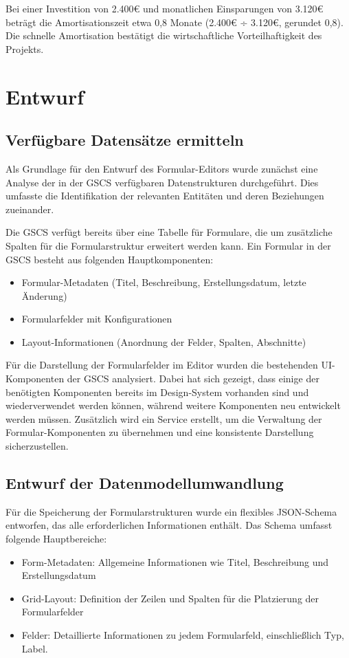 \documentclass[a4paper,11pt]{article}
\begin{document}
\noindent Bei einer Investition von 2.400€ und monatlichen Einsparungen von 3.120€ beträgt die Amortisationszeit etwa 0,8 Monate (2.400€ ÷ 3.120€, gerundet 0,8). Die schnelle Amortisation bestätigt die wirtschaftliche Vorteilhaftigkeit des Projekts.

\section{Entwurf}
\subsection{Verfügbare Datensätze ermitteln}
Als Grundlage für den Entwurf des Formular-Editors wurde zunächst eine Analyse der in der GSCS verfügbaren Datenstrukturen durchgeführt. Dies umfasste die Identifikation der relevanten Entitäten und deren Beziehungen zueinander.

\noindent Die GSCS verfügt bereits über eine Tabelle für Formulare, die um zusätzliche Spalten für die Formularstruktur erweitert werden kann. Ein Formular in der GSCS besteht aus folgenden Hauptkomponenten:

\begin{itemize}
  \item Formular-Metadaten (Titel, Beschreibung, Erstellungsdatum, letzte Änderung)
  \item Formularfelder mit Konfigurationen
  \item Layout-Informationen (Anordnung der Felder, Spalten, Abschnitte)
\end{itemize}

\noindent Für die Darstellung der Formularfelder im Editor wurden die bestehenden UI-Komponenten der GSCS analysiert. Dabei hat sich gezeigt, dass einige der benötigten Komponenten bereits im Design-System vorhanden sind und wiederverwendet werden können, während weitere Komponenten neu entwickelt werden müssen. Zusätzlich wird ein Service erstellt, um die Verwaltung der Formular-Komponenten zu übernehmen und eine konsistente Darstellung sicherzustellen.

\subsection{Entwurf der Datenmodellumwandlung}
Für die Speicherung der Formularstrukturen wurde ein flexibles JSON-Schema entworfen, das alle erforderlichen Informationen enthält. Das Schema umfasst folgende Hauptbereiche:

\begin{itemize}
  \item Form-Metadaten: Allgemeine Informationen wie Titel, Beschreibung und Erstellungsdatum
  \item Grid-Layout: Definition der Zeilen und Spalten für die Platzierung der Formularfelder
  \item Felder: Detaillierte Informationen zu jedem Formularfeld, einschließlich Typ, Label.
\end{itemize}
\end{document}
